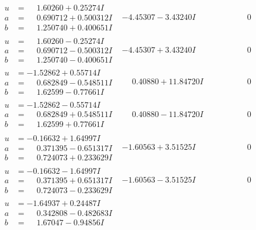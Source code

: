 \documentclass[1p]{elsarticle_modified}
\theoremstyle{definition}
\begin{document}
$$\begin{array}{c|c|c}
\begin{aligned}
u &= \phantom{-}1.60260 + 0.25274 I \\
a &= \phantom{-}0.690712 + 0.500312 I \\
b &= \phantom{-}1.250740 + 0.400651 I\end{aligned}
 & -4.45307 - 3.43240 I & \phantom{-0.000000 } 0 \\ \hline\begin{aligned}
u &= \phantom{-}1.60260 - 0.25274 I \\
a &= \phantom{-}0.690712 - 0.500312 I \\
b &= \phantom{-}1.250740 - 0.400651 I\end{aligned}
 & -4.45307 + 3.43240 I & \phantom{-0.000000 } 0 \\ \hline\begin{aligned}
u &= -1.52862 + 0.55714 I \\
a &= \phantom{-}0.682849 - 0.548511 I \\
b &= \phantom{-}1.62599 - 0.77661 I\end{aligned}
 & \phantom{-}0.40880 + 11.84720 I & \phantom{-0.000000 } 0 \\ \hline\begin{aligned}
u &= -1.52862 - 0.55714 I \\
a &= \phantom{-}0.682849 + 0.548511 I \\
b &= \phantom{-}1.62599 + 0.77661 I\end{aligned}
 & \phantom{-}0.40880 - 11.84720 I & \phantom{-0.000000 } 0 \\ \hline\begin{aligned}
u &= -0.16632 + 1.64997 I \\
a &= \phantom{-}0.371395 - 0.651317 I \\
b &= \phantom{-}0.724073 + 0.233629 I\end{aligned}
 & -1.60563 + 3.51525 I & \phantom{-0.000000 } 0 \\ \hline\begin{aligned}
u &= -0.16632 - 1.64997 I \\
a &= \phantom{-}0.371395 + 0.651317 I \\
b &= \phantom{-}0.724073 - 0.233629 I\end{aligned}
 & -1.60563 - 3.51525 I & \phantom{-0.000000 } 0 \\ \hline\begin{aligned}
u &= -1.64937 + 0.24487 I \\
a &= \phantom{-}0.342808 - 0.482683 I \\
b &= \phantom{-}1.67047 - 0.94856 I\end{aligned}

\end{array}$$
\end{document}
